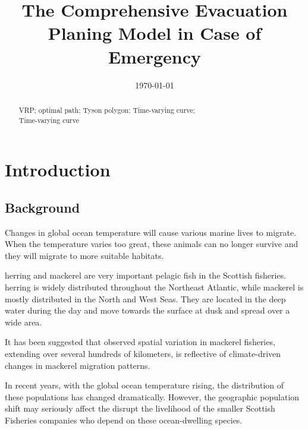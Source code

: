 \documentclass{mcmthesis}
\title{\large The Comprehensive Evacuation Planing Model in Case of Emergency}
\author{ }
\date{\today}
\begin{document}
\begin{abstract}



\begin{keywords}
VRP; optimal path; Tyson polygon; Time-varying curve; \\ \hspace*{1.2cm}Time-varying curve
\end{keywords}
\end{abstract}
\maketitle
\newpage                                                          %
\begin{adjustwidth}{-1cm}{0cm}

\setcounter{tocdepth}{3}
\thispagestyle{empty}
\tableofcontents                                                  %

\end{adjustwidth}


\newpage

\pagestyle{fancy}

\setcounter{page}{1}
\section{Introduction}
\subsection{Background}
Changes in global ocean temperature will cause various marine lives to migrate. When the temperature varies too great, these animals can no longer survive and they will migrate to more suitable habitats.

herring and mackerel are very important pelagic fish in the Scottish fisheries. herring is widely distributed throughout the Northeast Atlantic, while mackerel  is mostly distributed in the North and West Seas. They are located in the deep water during the day and move towards the surface at dusk and spread over a wide area.

It has been suggested that observed spatial variation in mackerel fisheries, extending over several hundreds of kilometers, is reflective of climate-driven changes in mackerel migration patterns. 

In recent years, with the global ocean temperature rising,  the distribution of these populations has changed dramatically. However, the geographic population shift may seriously affect the disrupt the livelihood of the smaller Scottish Fisheries companies who depend on these ocean-dwelling species.
\end{document}

